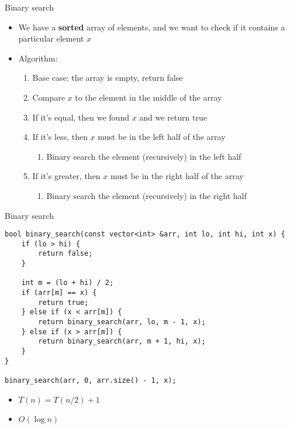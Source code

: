 \documentclass[12pt,t]{beamer}
\newcommand{\bi}{\begin{itemize}}
\newcommand{\ei}{\end{itemize}}
\begin{document}
\begin{frame}{Binary search}
    \vspace{20pt}
    \bi
        \item We have a \textbf{sorted} array of elements, and we want to check if it contains a particular element $x$
        \vspace{5pt}
        \item Algorithm:
            \begin{enumerate}
                \item Base case: the array is empty, return false
                \item Compare $x$ to the element in the middle of the array
                \item If it's equal, then we found $x$ and we return true
                \item If it's less, then $x$ must be in the left half of the array
                    \begin{enumerate}
                        \item Binary search the element (recursively) in the left half
                    \end{enumerate}
                \item If it's greater, then $x$ must be in the right half of the array
                    \begin{enumerate}
                        \item Binary search the element (recursively) in the right half
                    \end{enumerate}
            \end{enumerate}
    \ei
\end{frame}

\begin{frame}[fragile]{Binary search}
    \vspace{15pt}
    \begin{verbatim}
bool binary_search(const vector<int> &arr, int lo, int hi, int x) {
    if (lo > hi) {
        return false;
    }

    int m = (lo + hi) / 2;
    if (arr[m] == x) {
        return true;
    } else if (x < arr[m]) {
        return binary_search(arr, lo, m - 1, x);
    } else if (x > arr[m]) {
        return binary_search(arr, m + 1, hi, x);
    }
}

binary_search(arr, 0, arr.size() - 1, x);
    \end{verbatim}

    \bi
        \item $T(n) = T(n/2) + 1$
        \item $O(\log n)$
    \ei
\end{frame}
\end{document}
